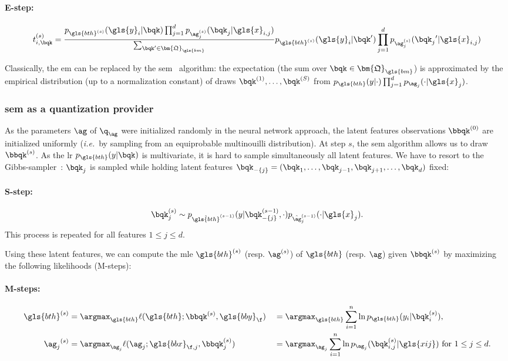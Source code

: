\paragraph{E-step:}
\[ t_{i,\bqk}^{(s)} = \frac{p_{\gls{bth}^{(s)}}(\gls{y}_i | \bqk) \prod_{j=1}^d p_{\ag_j^{(s)}}(\bqk_j | \gls{x}_{i,j})}{\sum_{\bqk ' \in \bm{\mathfrak{Q}}_{\gls{bm}}}} p_{\gls{bth}^{(s)}}(\gls{y}_i | \bqk ') \prod_{j=1}^d p_{{\ag}_j^{(s)}}(\bqk_j {'}  | \gls{x}_{i,j}) \]

Classically, the \gls{em} can be replaced by the \acrlong{sem}~\cite{celeux1985sem} algorithm: the expectation (the sum over $\bqk \in \bm{\mathfrak{Q}}_{\gls{bm}}$) is approximated by the empirical distribution (up to a normalization constant) of draws $\bqk^{(1)}, \dots, \bqk^{(S)}$ from $p_{\gls{bth}}(y | \cdot) \prod_{j=1}^d p_{\ag_j}(\cdot | \gls{x}_j)$.

\subsubsection{\gls{sem} as a quantization provider} \label{subsubsec:multinouilli}

As the parameters $\ag$ of $\q_{\ag}$ were initialized randomly in the neural network approach, the latent features observations $\bbqk^{(0)}$ are initialized uniformly (\textit{i.e.}\ by sampling from an equiprobable multinouilli distribution). At step $s$, the \gls{sem} algorithm allows us to draw $\bbqk^{(s)}$. As the \gls{lr} $p_{\gls{bth}}(y | \bqk)$ is multivariate, it is hard to sample simultaneously all latent features. We have to resort to the Gibbs-sampler~\cite{casella1992explaining}: $\bqk_j$ is sampled while holding latent features $\bqk_{-\{j\}} = (\bqk_1, \dots, \bqk_{j-1}, \bqk_{j+1}, \dots, \bqk_d)$ fixed:
\paragraph{S-step:}
\begin{equation} \label{eq:q_draw}
\bqk_j^{(s)} \sim p_{\hat{\gls{bth}}^{(s-1)}}(y | \bqk_{-\{j\}}^{(s-1)}, \cdot) p_{\hat{\ag}_j^{(s-1)}}(\cdot | \gls{x}_j).
\end{equation}
This process is repeated for all features $1 \leq j \leq d$.

Using these latent features, we can compute the \gls{mle} ${\gls{bth}}^{(s)}$ (resp. ${\ag}^{(s)}$) of $\gls{bth}$ (resp. $\ag$) given $\bbqk^{(s)}$ by maximizing the following likelihoods (M-steps):
\paragraph{M-steps:}
\begin{alignat}{2}
{\gls{bth}}^{(s)} & = \argmax_{\gls{bth}} \ell(\gls{bth}; \bbqk^{(s)}, \gls{bby}_\f) && = \argmax_{\gls{bth}} \sum_{i=1}^n \ln p_{\gls{bth}}(y_i | \bqk^{(s)}_i), \nonumber \\
{\ag_j}^{(s)} & = \argmax_{\ag_j} \ell(\ag_j; \gls{bbx}_{\f,j}, \bbqk^{(s)}_j) && = \argmax_{\ag_j} \sum_{i=1}^n \ln p_{\ag_j}(\bqk^{(s)}_{i,j} | \gls{xij}) \text{ for } 1 \leq j \leq d. \label{eq:mle_ag}
\end{alignat}

